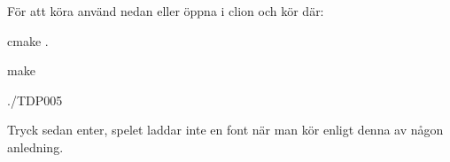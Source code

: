 För att köra använd nedan eller öppna i clion och kör där\+:

cmake .

make

./\+TDP005

Tryck sedan enter, spelet laddar inte en font när man kör enligt denna av någon anledning. 